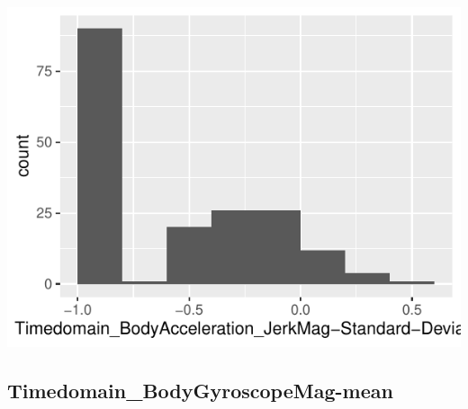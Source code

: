 \documentclass[
]{article}
\begin{document}
\begin{minipage}{0.25 \textwidth}

\includegraphics{codebook_tidydatasub_files/figure-latex/Var-38-Timedomain-BodyAcceleration-JerkMag-Standard-Deviation--1.pdf}

\end{minipage}

\noindent\makebox[\linewidth]{\rule{\textwidth}{0.4pt}}

\hypertarget{timedomain_bodygyroscopemag-mean}{%
\subsection{Timedomain\_BodyGyroscopeMag-mean}\label{timedomain_bodygyroscopemag-mean}}
\end{document}
